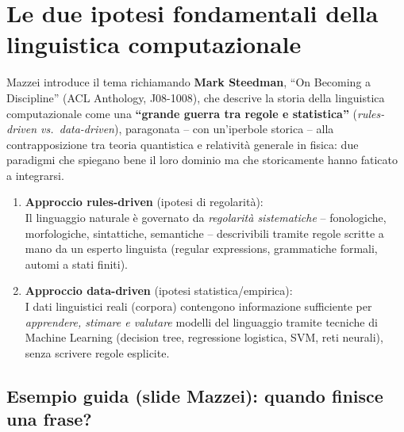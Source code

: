 \documentclass[12pt,a4paper]{article}
\begin{document}
\section{Le due ipotesi fondamentali della linguistica computazionale}

Mazzei introduce il tema richiamando \textbf{Mark Steedman}, ``On Becoming a Discipline'' (ACL Anthology, J08-1008), che descrive la storia della linguistica computazionale come una \textbf{``grande guerra tra regole e statistica''} (\emph{rules-driven vs.\ data-driven}), paragonata -- con un'iperbole storica -- alla contrapposizione tra teoria quantistica e relatività generale in fisica: due paradigmi che spiegano bene il loro dominio ma che storicamente hanno faticato a integrarsi.

\begin{defbox}
\begin{enumerate}[leftmargin=1.5em, label=\textbf{\Roman*.}]
  \item \textbf{Approccio rules-driven} (ipotesi di regolarità): \\
    Il linguaggio naturale è governato da \emph{regolarità sistematiche} -- fonologiche, morfologiche, sintattiche, semantiche -- descrivibili tramite regole scritte a mano da un esperto linguista (regular expressions, grammatiche formali, automi a stati finiti).

  \item \textbf{Approccio data-driven} (ipotesi statistica/empirica): \\
    I dati linguistici reali (corpora) contengono informazione sufficiente per \emph{apprendere, stimare e valutare} modelli del linguaggio tramite tecniche di Machine Learning (decision tree, regressione logistica, SVM, reti neurali), senza scrivere regole esplicite.
\end{enumerate}
\end{defbox}

\subsection{Esempio guida (slide Mazzei): quando finisce una frase?}
\end{document}
